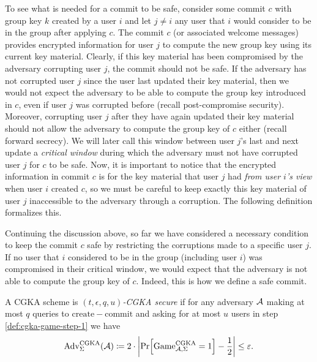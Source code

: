 To see what is needed for a commit to be safe, consider some commit $c$ with group key $k$ created by a user $i$ and let $j \neq i$ any user that $i$ would consider to be in the group after applying $c$. The commit $c$ (or associated welcome messages) provides encrypted information for user $j$ to compute the new group key using its current key material. Clearly, if this key material has been compromised by the adversary corrupting user $j$, the commit should not be safe. If the adversary has not corrupted user $j$ since the user last updated their key material, then we would not expect the adversary to be able to compute the group key introduced in $c$, even if user $j$ was corrupted before (recall post-compromise security). Moreover, corrupting user $j$ after they have again updated their key material should not allow the adversary to compute the group key of $c$ either (recall forward secrecy). We will later call this window between user $j$'s last and next update a \emph{critical window} during which the adversary must not have corrupted user $j$ for $c$ to be safe. Now, it is important to notice that the encrypted information in commit $c$ is for the key material that user $j$ had \emph{from user $i$'s view} when user $i$ created $c$, so we must be careful to keep exactly this key material of user $j$ inaccessible to the adversary through a corruption. The following definition formalizes this.

\begin{definition} \label{def:safe-user}
\end{definition}

Continuing the discussion above, so far we have considered a necessary condition to keep the commit $c$ safe by restricting the corruptions made to a specific user $j$. If no user that $i$ considered to be in the group (including user $i$) was compromised in their critical window, we would expect that the adversary is not able to compute the group key of $c$. Indeed, this is how we define a safe commit.

\begin{definition} \label{def:safe-commit}
\end{definition}


\begin{definition}
	A CGKA scheme is \emph{$(t, \epsilon, q, u)$-CGKA secure} if for any adversary $\mathcal{A}$ making at most $q$ queries to $\mathrm{create-commit}$ and asking for at most $u$ users in step \ref{def:cgka-game-step-1} we have
	\begin{align*}
		\mathrm{Adv}_{\Sigma}^{\mathrm{CGKA}}(\adv) \coloneqq 2 \cdot \abs*{\pr{\mathrm{Game}_{\adv, \Sigma}^{\mathrm{CGKA}} = 1} - \frac{1}{2}} \le \epsilon.
	\end{align*}
\end{definition}


